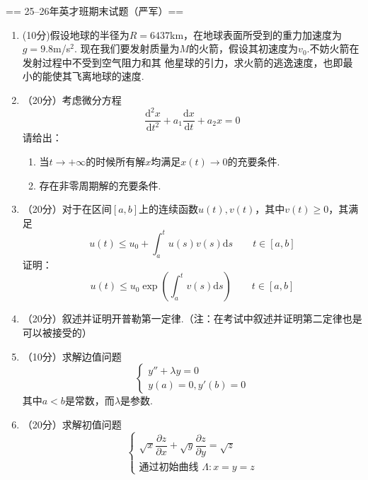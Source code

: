 

== 25--26年英才班期末试题（严军）==
\begin{enumerate}
    \item(10分)假设地球的半径为$R=6437$km，在地球表面所受到的重力加速度为$g=9.8$m/s$^2$.
    现在我们要发射质量为$M$的火箭，假设其初速度为$v_0$.不妨火箭在发射过程中不受到空气阻力和其
    他星球的引力，求火箭的逃逸速度，也即最小的能使其飞离地球的速度.

    \item（20分）考虑微分方程\[
    \frac{\mathrm{d}^2x}{\mathrm{d}t^2}+a_1\frac{\mathrm{d}x}{\mathrm{d}t}+a_2x=0
    \]
    请给出：
    \begin{enumerate}
        \item 当$t\to +\infty$的时候所有解$x$均满足$x(t)\to 0$的充要条件.
        \item 存在非零周期解的充要条件.
    \end{enumerate}

    \item（20分）对于在区间$[a,b]$上的连续函数$u(t),v(t)$，其中$v(t)\ge 0$，其满足\[
    u(t)\le u_0+\int_a^tu(s)v(s)\mathrm{d}s\qquad t\in [a,b]
    \]证明：\[
    u(t)\le u_0\exp(\int_a^tv(s)\mathrm{d}s)\qquad t\in[a,b]
    \]


    \item（20分）叙述并证明开普勒第一定律.（注：在考试中叙述并证明第二定律也是可以被接受的）

    \item（10分）求解边值问题\[\begin{cases}
         y''+\lambda y=0\\y(a)=0,y'(b)=0
    \end{cases}
    \]其中$a<b$是常数，而$\lambda$是参数.

    \item（20分）求解初值问题\[\begin{cases}
        \sqrt{x}\dfrac{\partial z}{\partial x}+\sqrt{y}\dfrac{\partial z}{\partial y}=\sqrt{z}\\ \text{通过初始曲线 }\Lambda:x=y=z
    \end{cases}\]
\end{enumerate}

